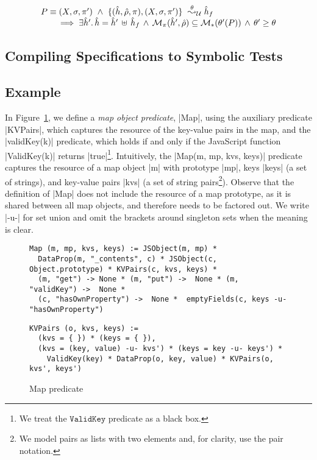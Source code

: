\begin{theorem}
$$
\begin{array}{l}
P \equiv (\existentials, \sfs, \pfs') \ \wedge \ \unificationfull{\sheap, \sstore, \pc}{\existentials, \sfs, \pfs'}{\sheap_f}{\subst} \\ 
   \qquad \implies 
		\exists \sheap' . \, \sheap = \sheap' \dunion \sheap_f  \, \wedge \, 
		\smodels{\sheap', \sstore}{\pc} \subseteq \sepmodels{\subst'(P)}  \, \wedge \, 
		\subst' \geq \subst 
\end{array}
$$ 

\end{theorem}

\subsection{Compiling Specifications to Symbolic Tests}



\subsection{Example} 

In Figure~\ref{fig:map:example}, we define a \emph{map object predicate}, \jsinline|Map|, 
using the auxiliary predicate \jsinline|KVPairs|, which captures the resource of the key-value pairs in the map, 
and the \jsinline|validKey(k)| predicate, which holds if and only if the 
JavaScript function \jsinline|ValidKey(k)| returns \jsinline|true|\footnote{We treat the $\mathtt{ValidKey}$ predicate as a black box.}.
%
Intuitively, the \jsinline|Map(m, mp, kvs, keys)| predicate captures the resource 
of a map object \jsinline|m| with prototype \jsinline|mp|, keys \jsinline|keys| (a set of strings),
and key-value pairs \jsinline|kvs| (a set of string pairs\footnote{We model pairs as lists with two elements and, for clarity, use the pair notation.}). 
Observe that the definition of \jsinline|Map| does not include the resource of a map prototype, as
it is shared between all map objects, and therefore needs to be factored out.  
%
We write \jsinline|-u-| for set union and omit the brackets around singleton 
sets when the meaning is clear. %

\begin{figure}[t!]
{\scriptsize
 \begin{verbatim}
Map (m, mp, kvs, keys) := JSObject(m, mp) * 
  DataProp(m, "_contents", c) * JSObject(c, Object.prototype) * KVPairs(c, kvs, keys) *
  (m, "get") -> None * (m, "put") ->  None * (m, "validKey") ->  None * 
  (c, "hasOwnProperty") ->  None *  emptyFields(c, keys -u- "hasOwnProperty")
  \end{verbatim}
  \vspace*{-0.3cm}
 \begin{verbatim}
KVPairs (o, kvs, keys) := 
  (kvs = { }) * (keys = { }),
  (kvs = (key, value) -u- kvs') * (keys = key -u- keys') * 
    ValidKey(key) * DataProp(o, key, value) * KVPairs(o, kvs', keys')
\end{verbatim}}
\caption{Map predicate \label{fig:map:example}}
\end{figure}

